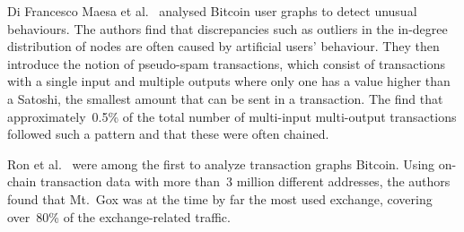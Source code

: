 Di Francesco Maesa et al.~\cite{10.1007/978-3-319-50901-3_59} analysed Bitcoin user graphs to detect unusual behaviours. The authors find that discrepancies such as outliers in the in-degree distribution of nodes are often caused by artificial users' behaviour. They then introduce the notion of pseudo-spam transactions, which consist of transactions with a single input and multiple outputs where only one has a value higher than a Satoshi, the smallest amount that can be sent in a transaction. The find that approximately~0.5\% of the total number of multi-input multi-output transactions followed such a pattern and that these were often chained.


Ron et al.~\cite{10.1007/978-3-642-39884-1_2} were among the first to analyze transaction graphs Bitcoin. Using on-chain transaction data with more than~3 million different addresses, the authors found that Mt.~Gox was at the time by far the most used exchange, covering over~80\% of the exchange-related traffic. 



